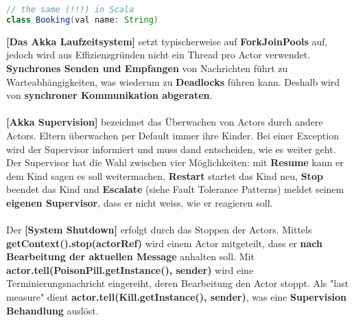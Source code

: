\documentclass[8pt]{extarticle}
\let\oldtextbf\textbf
\renewcommand{\textbf}{\tiny\oldtextbf}
\begin{document}
\begin{multicols*}{5}
\begin{lstlisting}[language=java]
// the same (!!!) in Scala
class Booking(val name: String)
\end{lstlisting}
\textbf{[Das Akka Laufzeitsystem]} setzt typischerweise auf \textbf{ForkJoinPools} auf, jedoch wird aus Effizienzgründen nicht ein Thread pro Actor verwendet. \textbf{Synchrones Senden und Empfangen} von Nachrichten führt zu Warteabhängigkeiten, was wiederum zu \textbf{Deadlocks} führen kann. Deshalb wird von \textbf{synchroner Kommunikation abgeraten}.\\\\
\textbf{[Akka Supervision]} bezeichnet das Überwachen von Actors durch andere Actors. Eltern überwachen per Default immer ihre Kinder. Bei einer Exception wird der Supervisor informiert und muss dand entscheiden, wie es weiter geht. Der Supervisor hat die Wahl zwischen vier Möglichkeiten: mit \textbf{Resume} kann er dem Kind sagen es soll weitermachen, \textbf{Restart} startet das Kind neu, \textbf{Stop} beendet das Kind und \textbf{Escalate} (siehe Fault Tolerance Patterns) meldet seinem \textbf{eigenen Supervisor}, dass er nicht weiss, wie er reagieren soll.\\\\
Der \textbf{[System Shutdown]} erfolgt durch das Stoppen der Actors. Mittels \textbf{getContext().stop(actorRef)} wird einem Actor mitgeteilt, dass er \textbf{nach Bearbeitung der aktuellen Message} anhalten soll. Mit \textbf{actor.tell(PoisonPill.getInstance(), sender)} wird eine Terminierungsnachricht eingereiht, deren Bearbeitung den Actor stoppt. Als "last measure" dient \textbf{actor.tell(Kill.getInstance(), sender)}, was eine \textbf{Supervision Behandlung} auslöst.
\end{multicols*}
\end{document}
